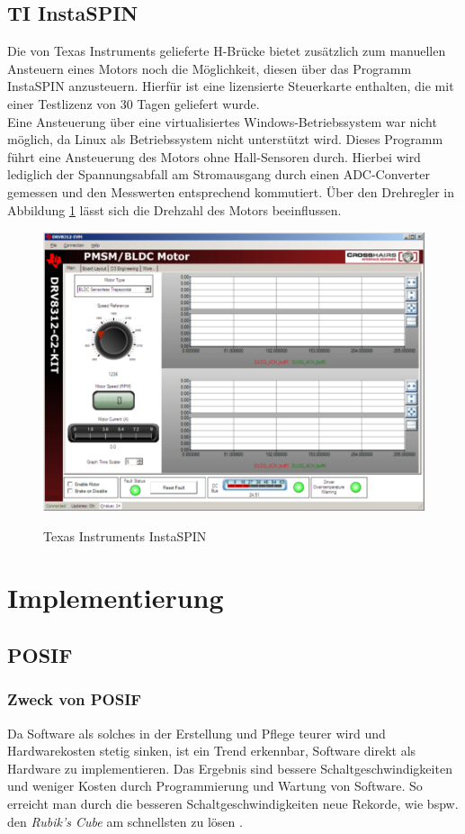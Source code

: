 \subsection{TI InstaSPIN}
Die von Texas Instruments gelieferte H-Brücke bietet zusätzlich zum manuellen Ansteuern eines Motors noch die Möglichkeit, diesen über das Programm InstaSPIN anzusteuern. Hierfür ist eine lizensierte Steuerkarte enthalten, die mit einer Testlizenz von 30 Tagen geliefert wurde. \\
Eine Ansteuerung über eine virtualisiertes Windows-Betriebssystem war nicht möglich, da Linux als Betriebssystem nicht unterstützt wird. Dieses Programm führt eine Ansteuerung des Motors ohne Hall-Sensoren durch. Hierbei wird lediglich der Spannungsabfall am Stromausgang durch einen ADC-Converter gemessen und den Messwerten entsprechend kommutiert. Über den Drehregler in Abbildung \ref{fig:InstaSPIN} lässt sich die Drehzahl des Motors beeinflussen.
\begin{figure}
    \includegraphics[width=\textwidth]{motor/InstaSPIN}
    \caption{Texas Instruments InstaSPIN}
    \quelle \cite{Instruments2011}
    \label{fig:InstaSPIN}
\end{figure}
\section{Implementierung}
\subsection{POSIF}
\subsubsection{Zweck von POSIF}
Da Software als solches in der Erstellung und Pflege teurer wird und Hardwarekosten stetig sinken, ist ein Trend erkennbar, Software direkt als Hardware zu implementieren. Das Ergebnis sind bessere Schaltgeschwindigkeiten und weniger Kosten durch Programmierung und Wartung von Software. So erreicht man durch die besseren Schaltgeschwindigkeiten neue Rekorde, wie bspw. den \emph{Rubik's Cube} am schnellsten zu lösen \cite{POSIF2016}.

